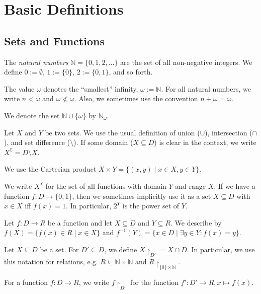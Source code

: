 \section{Basic Definitions}

\subsection{Sets and Functions}
\begin{defn}
	The \emph{natural numbers} $\mathbb{N} = \{0, 1, 2, \dots\}$ are the set of all non-negative integers. We define $0 := \emptyset$, $1 := \{0\}$, $2 := \{0, 1\}$, and so forth.
	
	The value $\omega$ denotes the \enquote{smallest} infinity, $\omega := \mathbb{N}$. For all natural numbers, we write $n < \omega$ and $\omega \not < \omega$. Also, we sometimes use the convention $n + \omega = \omega$.
	
	We denote the set $\mathbb{N} \cup \{\omega\}$ by $\mathbb{N}_\omega$.
\end{defn}

\begin{defn}
	Let $X$ and $Y$ be two sets. We use the usual definition of union ($\cup$), intersection ($\cap$), and set difference ($\setminus$). If some domain ($X \subseteq D$) is clear in the context, we write $X^\complement = D \setminus X$.
	
	We use the Cartesian product $X \times Y = \{ (x, y) \mid x \in X, y \in Y \}$.
	
	We write $X^Y$ for the set of all functions with domain $Y$ and range $X$. If we have a function $f : D \rightarrow \{0, 1\}$, then we sometimes implicitly use it as a set $X \subseteq D$ with $x \in X$ iff $f(x) = 1$. In particular, $2^Y$ is the power set of $Y$.
\end{defn}

\begin{defn}
	Let $f : D \rightarrow R$ be a function and let $X \subseteq D$ and $Y \subseteq R$. We describe by $f(X) = \{ f(x) \in R \mid x \in X\}$ and $f^{-1}(Y) = \{ x \in D \mid \exists y \in Y: f(x) = y \}$.
\end{defn}

\begin{defn}
	Let $X \subseteq D$ be a set. For $D' \subseteq D$, we define $X \upharpoonright_{D'} = X \cap D$. In particular, we use this notation for relations, e.g. $R \subseteq \mathbb{N} \times \mathbb{N}$ and $R \upharpoonright_{\{0\} \times \mathbb{N}}$.
	
	For a function $f : D \rightarrow R$, we write $f \upharpoonright_{D'}$ for the function $f' : D' \rightarrow R, x \mapsto f(x)$.
\end{defn}


